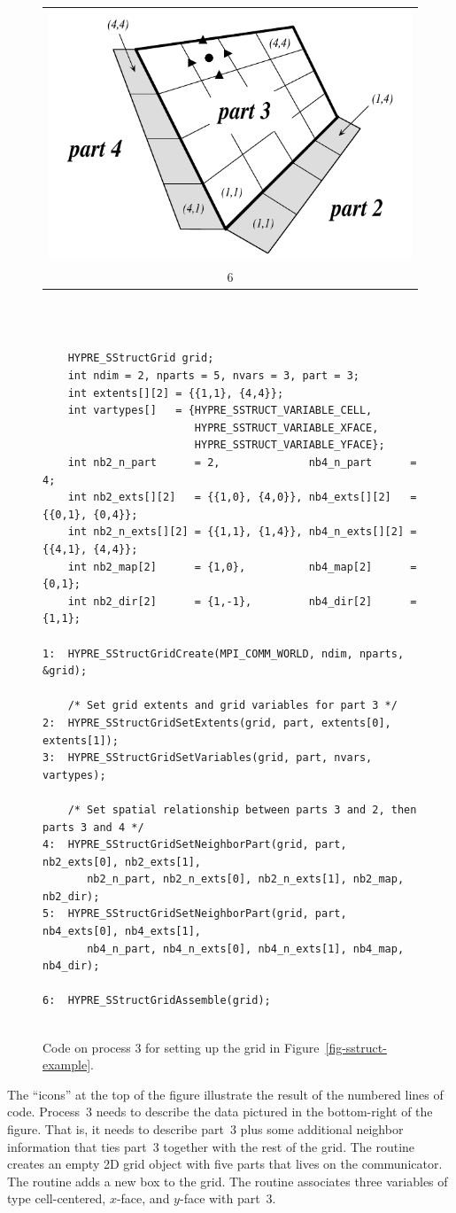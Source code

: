 \begin{figure}
\begin{tabular}{@{}c@{}}
\end{tabular}
\hfill
\begin{tabular}{@{}c@{}}
\includegraphics[width=.28\textwidth]{figSStructGrid6} \\ 6
\end{tabular}
\vspace{2em} \\
\begin{minipage}{0.9\textwidth}
\begin{verbatim}
    
    HYPRE_SStructGrid grid;
    int ndim = 2, nparts = 5, nvars = 3, part = 3;
    int extents[][2] = {{1,1}, {4,4}};
    int vartypes[]   = {HYPRE_SSTRUCT_VARIABLE_CELL,
                        HYPRE_SSTRUCT_VARIABLE_XFACE,
                        HYPRE_SSTRUCT_VARIABLE_YFACE};
    int nb2_n_part      = 2,              nb4_n_part      = 4;
    int nb2_exts[][2]   = {{1,0}, {4,0}}, nb4_exts[][2]   = {{0,1}, {0,4}};
    int nb2_n_exts[][2] = {{1,1}, {1,4}}, nb4_n_exts[][2] = {{4,1}, {4,4}};
    int nb2_map[2]      = {1,0},          nb4_map[2]      = {0,1};
    int nb2_dir[2]      = {1,-1},         nb4_dir[2]      = {1,1};

1:  HYPRE_SStructGridCreate(MPI_COMM_WORLD, ndim, nparts, &grid);
    
    /* Set grid extents and grid variables for part 3 */
2:  HYPRE_SStructGridSetExtents(grid, part, extents[0], extents[1]);
3:  HYPRE_SStructGridSetVariables(grid, part, nvars, vartypes);
    
    /* Set spatial relationship between parts 3 and 2, then parts 3 and 4 */
4:  HYPRE_SStructGridSetNeighborPart(grid, part, nb2_exts[0], nb2_exts[1],
       nb2_n_part, nb2_n_exts[0], nb2_n_exts[1], nb2_map, nb2_dir);
5:  HYPRE_SStructGridSetNeighborPart(grid, part, nb4_exts[0], nb4_exts[1],
       nb4_n_part, nb4_n_exts[0], nb4_n_exts[1], nb4_map, nb4_dir);
    
6:  HYPRE_SStructGridAssemble(grid);
    
\end{verbatim}
\end{minipage}
\caption{%
Code on process 3 for setting up the grid in Figure~\ref{fig-sstruct-example}.}
\label{fig-sstruct-grid}
\end{figure}
The ``icons'' at the top of the figure illustrate the result of the numbered
lines of code.  Process~3 needs to describe the data pictured in the
bottom-right of the figure.  That is, it needs to describe part~3 plus some
additional neighbor information that ties part~3 together with the rest of the
grid.  The  routine creates an empty 2D grid object with five
parts that lives on the  communicator.  The
 routine adds a new box to the grid.  The
 routine associates three variables of type cell-centered,
$x$-face, and $y$-face with part~3.


